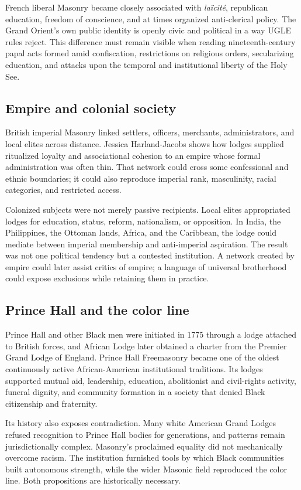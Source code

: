 French liberal Masonry became closely associated with \emph{laïcité}, republican education, freedom of conscience, and at times organized anti-clerical policy. The Grand Orient's own public identity is openly civic and political in a way UGLE rules reject. This difference must remain visible when reading nineteenth-century papal acts formed amid confiscation, restrictions on religious orders, secularizing education, and attacks upon the temporal and institutional liberty of the Holy See.

\subsection{Empire and colonial society}

British imperial Masonry linked settlers, officers, merchants, administrators, and local elites across distance. Jessica Harland-Jacobs shows how lodges supplied ritualized loyalty and associational cohesion to an empire whose formal administration was often thin. That network could cross some confessional and ethnic boundaries; it could also reproduce imperial rank, masculinity, racial categories, and restricted access.

Colonized subjects were not merely passive recipients. Local elites appropriated lodges for education, status, reform, nationalism, or opposition. In India, the Philippines, the Ottoman lands, Africa, and the Caribbean, the lodge could mediate between imperial membership and anti-imperial aspiration. The result was not one political tendency but a contested institution. A network created by empire could later assist critics of empire; a language of universal brotherhood could expose exclusions while retaining them in practice.

\subsection{Prince Hall and the color line}

Prince Hall and other Black men were initiated in 1775 through a lodge attached to British forces, and African Lodge later obtained a charter from the Premier Grand Lodge of England. Prince Hall Freemasonry became one of the oldest continuously active African-American institutional traditions. Its lodges supported mutual aid, leadership, education, abolitionist and civil-rights activity, funeral dignity, and community formation in a society that denied Black citizenship and fraternity.

Its history also exposes contradiction. Many white American Grand Lodges refused recognition to Prince Hall bodies for generations, and patterns remain jurisdictionally complex. Masonry's proclaimed equality did not mechanically overcome racism. The institution furnished tools by which Black communities built autonomous strength, while the wider Masonic field reproduced the color line. Both propositions are historically necessary.

